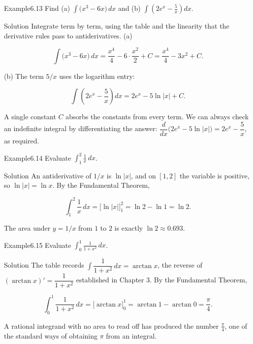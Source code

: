 \documentclass[a4paper,12pt,oneside]{memoir}
\begin{document}
\begin{workedexample}
\begin{envexample}{Example}{6.13}{}
Find (a) \(\displaystyle\int \bigl(x^{3} - 6x\bigr)\,dx\) and (b) \(\displaystyle\int \left(2e^{x} - \frac{5}{x}\right)dx\).
\end{envexample}
\begin{envsolution}{Solution}{}{}
Integrate term by term, using the table and the linearity that the derivative rules pass to antiderivatives. (a)

\[ \int \bigl(x^{3} - 6x\bigr)\,dx = \frac{x^{4}}{4} - 6\cdot\frac{x^{2}}{2} + C = \frac{x^{4}}{4} - 3x^{2} + C. \]

(b) The term \(5/x\) uses the logarithm entry:

\[ \int \left(2e^{x} - \frac{5}{x}\right)dx = 2e^{x} - 5\ln\lvert x\rvert + C. \]

A single constant \(C\) absorbs the constants from every term. We can always check an indefinite integral by differentiating the answer: \(\dfrac{d}{dx}\bigl(2e^{x} - 5\ln\lvert x\rvert\bigr) = 2e^{x} - \dfrac{5}{x}\), as required. \qedmark
\end{envsolution}
\end{workedexample}
\begin{workedexample}
\begin{envexample}{Example}{6.14}{}
Evaluate \(\displaystyle\int_{1}^{2} \frac{1}{x}\,dx\).
\end{envexample}
\begin{envsolution}{Solution}{}{}
An antiderivative of \(1/x\) is \(\ln\lvert x\rvert\), and on \([1, 2]\) the variable is positive, so \(\ln\lvert x\rvert = \ln x\). By the Fundamental Theorem,

\[ \int_{1}^{2} \frac{1}{x}\,dx = \bigl[\ln\lvert x\rvert\bigr]_{1}^{2} = \ln 2 - \ln 1 = \ln 2. \]

The area under \(y = 1/x\) from \(1\) to \(2\) is exactly \(\ln 2 \approx 0.693\). \qedmark
\end{envsolution}
\end{workedexample}
\begin{workedexample}
\begin{envexample}{Example}{6.15}{}
Evaluate \(\displaystyle\int_{0}^{1} \frac{1}{1 + x^{2}}\,dx\).
\end{envexample}
\begin{envsolution}{Solution}{}{}
The table records \(\int \dfrac{1}{1 + x^{2}}\,dx = \arctan x\), the reverse of \((\arctan x)' = \dfrac{1}{1 + x^{2}}\) established in Chapter 3. By the Fundamental Theorem,

\[ \int_{0}^{1} \frac{1}{1 + x^{2}}\,dx = \bigl[\arctan x\bigr]_{0}^{1} = \arctan 1 - \arctan 0 = \frac{\pi}{4}. \]

A rational integrand with no area to read off has produced the number \(\tfrac{\pi}{4}\), one of the standard ways of obtaining \(\pi\) from an integral. \qedmark
\end{envsolution}
\end{workedexample}
\end{document}
